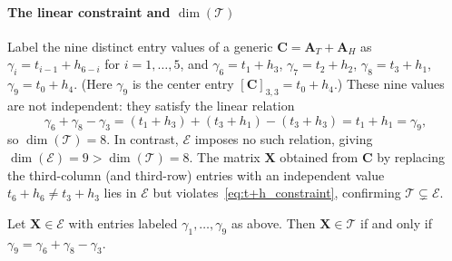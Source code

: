 \documentclass{siamart251216}
\def\bA{\mathbf{A}}
\def\bC{\mathbf{C}}
\def\bX{\mathbf{X}}
\begin{document}
\paragraph{The linear constraint and $\dim(\mathscr{T})$}
Label the nine distinct entry values of a generic $\bC = \bA_T + \bA_H$ as
$\gamma_i = t_{i-1} + h_{6-i}$ for $i=1,\dots,5$, and
$\gamma_6 = t_1+h_3$, $\gamma_7 = t_2+h_2$, $\gamma_8 = t_3+h_1$, $\gamma_9 = t_0+h_4$.
(Here $\gamma_9$ is the center entry $[\bC]_{3,3} = t_0+h_4$.)
These nine values are not independent: they satisfy the linear relation
\begin{equation}
\label{eq:t+h_constraint}
\gamma_6 + \gamma_8 - \gamma_3 = (t_1+h_3)+(t_3+h_1)-(t_3+h_3) = t_1+h_1 = \gamma_9,
\end{equation}
so $\dim(\mathscr{T}) = 8$.  In contrast, $\mathscr{E}$ imposes no such relation, giving
$\dim(\mathscr{E}) = 9 > \dim(\mathscr{T}) = 8$.  The matrix $\bX$ obtained from $\bC$ by
replacing the third-column (and third-row) entries with an independent value $t_6+h_6 \ne
t_3+h_3$ lies in $\mathscr{E}$ but violates~\eqref{eq:t+h_constraint}, confirming
$\mathscr{T}\subsetneq\mathscr{E}$.

\begin{lemma}
\label{lem:t+h_constraint}
Let $\bX\in\mathscr{E}$ with entries labeled $\gamma_1,\dots,\gamma_9$ as above.  Then
$\bX\in\mathscr{T}$ if and only if $\gamma_9 = \gamma_6 + \gamma_8 - \gamma_3$.
\end{lemma}
\end{document}
